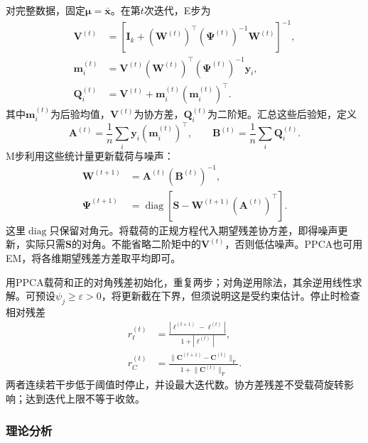 对完整数据，固定$\bm{\mu}=\bar{\bm{x}}$。在第$t$次迭代，E步为
\begin{equation}
\label{eq:dim-fa-estep}
\begin{aligned}
\bm{V}^{(t)}
&=\left[\bm{I}_k+
(\bm{W}^{(t)})^\top(\bm{\Psi}^{(t)})^{-1}
\bm{W}^{(t)}\right]^{-1},\\
\bm{m}_i^{(t)}
&=\bm{V}^{(t)}(\bm{W}^{(t)})^\top
(\bm{\Psi}^{(t)})^{-1}\bm{y}_i,\\
\bm{Q}_i^{(t)}
&=\bm{V}^{(t)}+\bm{m}_i^{(t)}(\bm{m}_i^{(t)})^\top.
\end{aligned}
\end{equation}
其中$\bm{m}_i^{(t)}$为后验均值，$\bm{V}^{(t)}$为协方差，$\bm{Q}_i^{(t)}$为二阶矩。汇总这些后验矩，定义
\[
\bm{A}^{(t)}=\frac1n\sum_i\bm{y}_i(\bm{m}_i^{(t)})^\top,
\qquad
\bm{B}^{(t)}=\frac1n\sum_i\bm{Q}_i^{(t)}.
\]
M步利用这些统计量更新载荷与噪声：
\begin{equation}
\label{eq:dim-fa-mstep}
\begin{aligned}
\bm{W}^{(t+1)}&=\bm{A}^{(t)}(\bm{B}^{(t)})^{-1},\\
\bm{\Psi}^{(t+1)}
&=\operatorname{diag}\left[
\bm{S}-\bm{W}^{(t+1)}(\bm{A}^{(t)})^\top
\right].
\end{aligned}
\end{equation}
这里$\operatorname{diag}$只保留对角元。将载荷的正规方程代入期望残差协方差，即得噪声更新，实际只需$\bm{S}$的对角。不能省略二阶矩中的$\bm{V}^{(t)}$，否则低估噪声。PPCA也可用EM，将各维期望残差方差取平均即可。

用PPCA载荷和正的对角残差初始化，重复两步；对角逆用除法，其余逆用线性求解。可预设$\psi_j\geq\varepsilon>0$，将更新截在下界，但须说明这是受约束估计。停止时检查相对残差
\begin{equation}
\label{eq:dim-fa-stopping}
\begin{aligned}
r_\ell^{(t)}
&=\frac{|\ell^{(t+1)}-\ell^{(t)}|}{1+|\ell^{(t)}|},\\
r_C^{(t)}
&=\frac{\lVert\bm{C}^{(t+1)}-\bm{C}^{(t)}\rVert_{\mathrm{F}}}
{1+\lVert\bm{C}^{(t)}\rVert_{\mathrm{F}}}.
\end{aligned}
\end{equation}
两者连续若干步低于阈值时停止，并设最大迭代数。协方差残差不受载荷旋转影响；达到迭代上限不等于收敛。

\subsubsection{理论分析}
\label{sec:dim-ppca-analysis}

